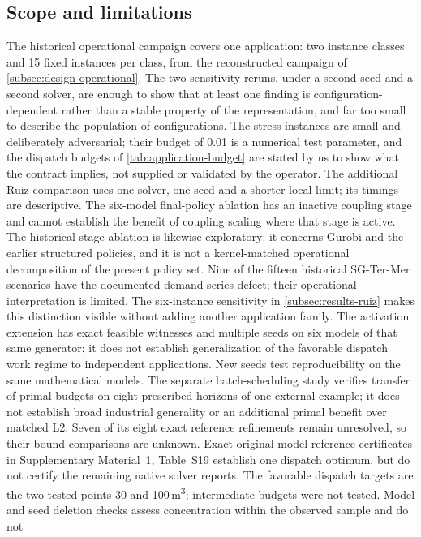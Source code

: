\documentclass[11pt]{article}
\theoremstyle{definition}
\theoremstyle{remark}
\begin{document}
\subsection{Scope and limitations}
The historical operational campaign covers one application: two instance classes and 15 fixed
instances per class, from the reconstructed campaign of \cref{subsec:design-operational}. The two
sensitivity reruns, under a second seed and a second solver, are enough to show that at least
one finding is configuration-dependent rather than a stable property of the representation, and
far too small to describe the population of configurations. The stress instances are small and
deliberately adversarial; their budget of 0.01 is a numerical test parameter, and the dispatch
budgets of \cref{tab:application-budget} are stated by us to show what the contract implies,
not supplied or validated by the operator. The additional Ruiz comparison uses one solver,
one seed and a shorter local limit; its timings are descriptive. The six-model final-policy
ablation has an inactive coupling stage and cannot establish the benefit of coupling
scaling where that stage is active. The historical stage ablation is likewise
exploratory: it concerns Gurobi and the earlier structured policies, and it is not a
kernel-matched operational decomposition of the present policy set. Nine of the fifteen
historical SG-Ter-Mer scenarios have the documented demand-series defect; their
operational interpretation is limited. The six-instance sensitivity in
\cref{subsec:results-ruiz} makes this distinction visible without adding another
application family. The activation extension has exact feasible witnesses
and multiple seeds on six models of that same generator; it does not establish
generalization of the favorable dispatch work regime to independent applications.
New seeds test reproducibility on the same mathematical models. The separate
batch-scheduling study verifies transfer of primal budgets on eight prescribed
horizons of one external example; it does not establish broad industrial
generality or an additional primal benefit over matched L2. Seven of its eight
exact reference refinements remain unresolved, so their bound comparisons are
unknown. Exact original-model reference certificates in
Supplementary Material~1, Table~S19 establish one dispatch optimum, but do not
certify the remaining native solver reports.
The favorable dispatch targets are the two tested points 30 and
100\,m\textsuperscript{3}; intermediate budgets were not tested. Model and seed
deletion checks assess concentration within the observed sample and do not
\end{document}
